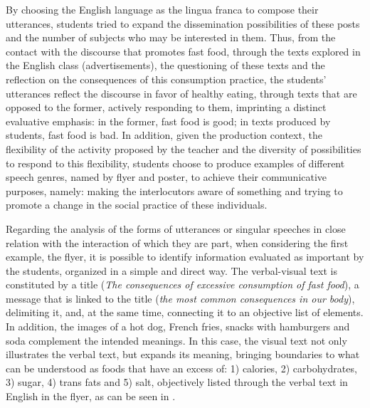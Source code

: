 \documentclass[english]{textolivre}
\begin{document}
By choosing the English language as the lingua franca \cite{brasilministeriocurricular} to compose their utterances, students tried to expand the dissemination possibilities of these posts and the number of subjects who may be interested in them. Thus, from the contact with the discourse that promotes fast food, through the texts explored in the English class (advertisements), the questioning of these texts and the reflection on the consequences of this consumption practice, the students’ utterances reflect the discourse in favor of healthy eating, through texts that are opposed to the former, actively responding to them, imprinting a distinct evaluative emphasis: in the former, fast food is good; in texts produced by students, fast food is bad. In addition, given the production context, the flexibility of the activity proposed by the teacher and the diversity of possibilities to respond to this flexibility, students choose to produce examples of different speech genres, named by flyer and poster, to achieve their communicative purposes, namely: making the interlocutors aware of something and trying to promote a change in the social practice of these individuals.

Regarding the analysis of the forms of utterances or singular speeches in close relation with the interaction of which they are part, when considering the first example, the flyer, it is possible to identify information evaluated as important by the students, organized in a simple and direct way. The verbal-visual text is constituted by a title (\emph{The consequences of excessive consumption of fast food}), a message that is linked to the title (\emph{the most common consequences in our body}), delimiting it, and, at the same time, connecting it to an objective list of elements. In addition, the images of a hot dog, French fries, snacks with hamburgers and soda complement the intended meanings. In this case, the visual text not only illustrates the verbal text, but expands its meaning, bringing boundaries to what can be understood as foods that have an excess of: 1) calories, 2) carbohydrates, 3) sugar, 4) trans fats and 5) salt, objectively listed through the verbal text in English in the flyer, as can be seen in .
\end{document}
